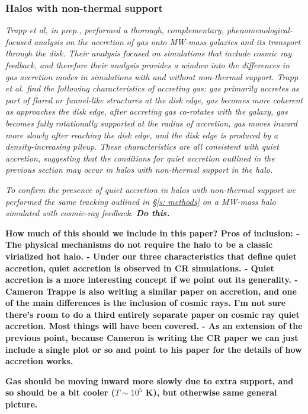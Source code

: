 \documentclass[fleqn,usenatbib]{mnras}
\begin{document}
\subsubsection{Halos with non-thermal support}

\textit{
Trapp et al, in prep., performed a thorough, complementary, phenomenological-focused analysis on the accretion of gas onto MW-mass galaxies and its transport through the disk.
Their analysis focused on simulations that include cosmic ray feedback, and therefore their analysis provides a window into the differences in gas accretion modes in simulations with and without non-thermal support.
Trapp et al. find the following characteristics of accreting gas:
gas primarily accretes as part of flared or funnel-like structures at the disk edge,
gas becomes more coherent as approaches the disk edge,
after accreting gas co-rotates with the galaxy,
gas becomes fully rotationally supported at the radius of accretion,
gas moves inward more slowly after reaching the disk edge,
and the disk edge is produced by a density-increasing pileup.
These characteristics are all consistent with quiet accretion, suggesting that the conditions for quiet accretion outlined in the previous section may occur in halos with non-thermal support in the halo.
}

\textit{
To confirm the presence of quiet accretion in halos with non-thermal support we performed the same tracking outlined in \S\ref{s: methods} on a MW-mass halo simulated with cosmic-ray feedback.
\textbf{Do this.}
}

\textbf{How much of this should we include in this paper?
Pros of inclusion:
- The physical mechanisms do not require the halo to be a classic virialized hot halo.
- Under our three characteristics that define quiet accretion, quiet accretion is observed in CR simulations.
- Quiet accretion is a more interesting concept if we point out its generality.
- Cameron Trappe is also writing a similar paper on accretion, and one of the main differences is the inclusion of cosmic rays. I'm not sure there's room to do a third entirely separate paper on cosmic ray quiet accretion. Most things will have been covered.
- As an extension of the previous point, because Cameron is writing the CR paper we can just include a single plot or so and point to his paper for the details of how accretion works.
}

\textbf{Gas should be moving inward more slowly due to extra support, and so should be a bit cooler ($T\sim 10^5$ K), but otherwise same general picture.}
\end{document}
